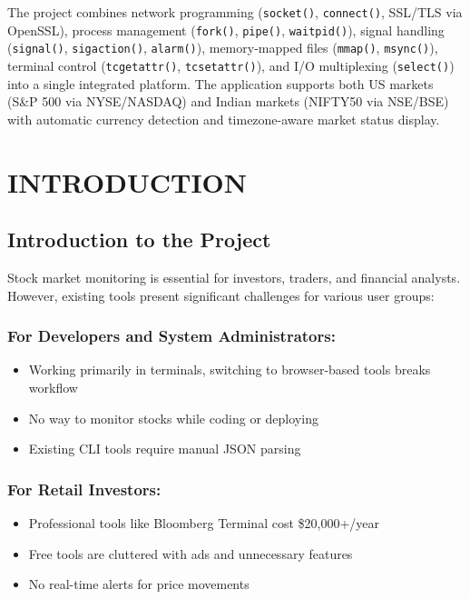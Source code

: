 \documentclass[12pt,a4paper]{article}
\begin{document}
The project combines network programming (\texttt{socket()}, \texttt{connect()}, SSL/TLS via OpenSSL), process management (\texttt{fork()}, \texttt{pipe()}, \texttt{waitpid()}), signal handling (\texttt{signal()}, \texttt{sigaction()}, \texttt{alarm()}), memory-mapped files (\texttt{mmap()}, \texttt{msync()}), terminal control (\texttt{tcgetattr()}, \texttt{tcsetattr()}), and I/O multiplexing (\texttt{select()}) into a single integrated platform. The application supports both US markets (S\&P 500 via NYSE/NASDAQ) and Indian markets (NIFTY50 via NSE/BSE) with automatic currency detection and timezone-aware market status display.

\newpage

\section{INTRODUCTION}

\subsection{Introduction to the Project}

Stock market monitoring is essential for investors, traders, and financial analysts. However, existing tools present significant challenges for various user groups:

\subsubsection{For Developers and System Administrators:}
\begin{itemize}[itemsep=0.3em]
    \item Working primarily in terminals, switching to browser-based tools breaks workflow
    \item No way to monitor stocks while coding or deploying
    \item Existing CLI tools require manual JSON parsing
\end{itemize}

\subsubsection{For Retail Investors:}
\begin{itemize}[itemsep=0.3em]
    \item Professional tools like Bloomberg Terminal cost \$20,000+/year
    \item Free tools are cluttered with ads and unnecessary features
    \item No real-time alerts for price movements
\end{itemize}
\end{document}

